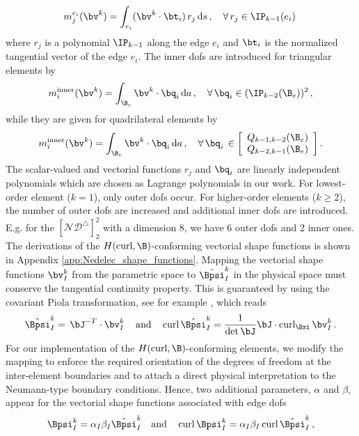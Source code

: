    \begin{equation}
   \label{eq:t:edge_dof}
 m^{e_i}_{j} (\bv^k ) = \int_{e_i} (\bv^k \cdot \bt_i)  \, r_{j} \, \textrm{d} s \,, \quad \forall \, r_j \in \IP_{k-1}(e_i)\,
   \end{equation}  
   where $r_{j}$ is a polynomial $\IP_{k-1}$  along the edge $e_i$ and $\bt_i$ is the normalized tangential vector of the edge $e_i$. The inner dofs are introduced for triangular elements by 
\begin{equation}   
   \label{eq:t:inner_dof_t}
 m^\textrm{inner}_{i}  (\bv^k )   =  \int_{\B_e} \bv^k \cdot \bq_{i} \, \textrm{d} a \,, \quad \forall \, \bq_i \in (\IP_{k-2} (\B_e))^2\, ,
   \end{equation}
   while they are given for quadrilateral elements by
   \begin{equation}   
     \label{eq:t:inner_dof_q}
 m^\textrm{inner}_{i}  (\bv^k )    =  \int_{\B_e} \bv^k   \cdot \bq_{i} \, \textrm{d} a \,, \quad \forall \, \bq_i  \, 
   \in
    \left[ \begin{array}{c}
 Q_{k-1,k-2}  (\B_e) \\
 Q_{k-2,k-1}  (\B_e)
\end{array} \right].
   \end{equation}
 The scalar-valued and vectorial functions $r_j$ and $\bq_i$ are linearly independent polynomials which are chosen as Lagrange polynomials in our work. For lowest-order element ($k=1$), only outer dofs occur. For higher-order elements ($k \ge 2$), the number of outer dofs are increased and additional inner dofs are introduced. E.g. for the $\left[ \mathcal{ND}^\triangle \right]^{2}_2$ with a dimension 8, we have 6 outer dofs and 2 inner ones. The derivations of the $H(\curl,\B)$-conforming vectorial shape functions is shown in Appendix \ref{app:Nedelec_shape_functions}.  Mapping the vectorial shape functions $ \bv^k_I$ from the parametric space to $\hat\Bpsi^k_I $ in the physical space must conserve the tangential continuity property. This is guaranteed by using the covariant Piola transformation, see for example \cite{RogKirAnd:2009:eao}, which reads
\begin{equation}
\hat{\Bpsi}^k_I =  \, \bJ^{-T} \cdot \bv^k_I\, \quad \textrm{and} \quad \curl{\hat{\Bpsi}^k_I} = \frac{1 }{\det{\bJ}} \bJ \cdot \curl_{\Bxi}\bv^k_I\,. 
\end{equation}
For our implementation of the $H(\curl,\B)$-conforming elements, we modify the mapping to enforce the required orientation of the degrees of freedom at the inter-element boundaries and to attach a direct physical interpretation to the Neumann-type boundary conditions. Hence, two additional parameters, $\alpha$ and $\beta$, appear for the vectorial shape functions associated with edge dofs 
\begin{equation}
\label{eq:t:mpiola}
{{\Bpsi}}^k_I  = \alpha_I \beta_I {\hat\Bpsi}^k_I   \quad \textrm{and} \quad \curl{{\Bpsi}^k_I} = \alpha_I \beta_I  \curl{{\hat\Bpsi}^k_I} \,, 
\end{equation}

